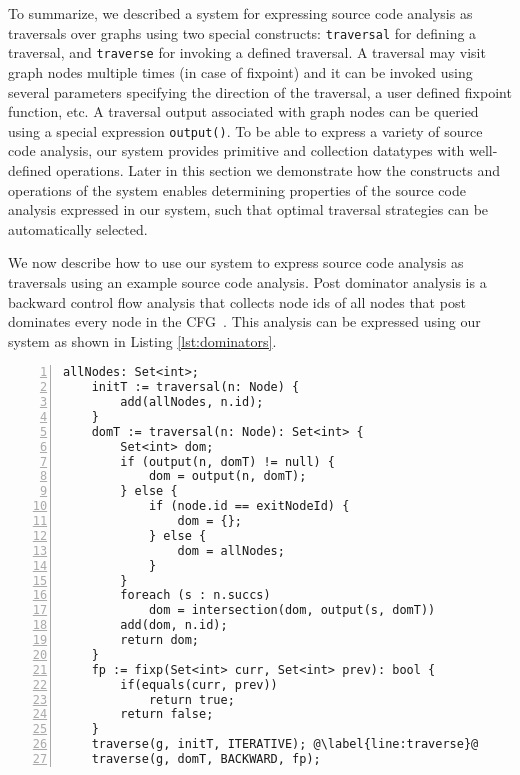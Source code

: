 To summarize, we described a system for expressing source code analysis as
traversals over graphs using two special constructs: \lstinline|traversal| for
defining a traversal, and \lstinline|traverse| for invoking a defined traversal. 
A traversal may visit graph nodes multiple times (in case of fixpoint) and it
can be invoked using several parameters specifying the direction of the
traversal, a user defined fixpoint function, etc.
A traversal output associated with graph nodes can be queried using a special
expression \lstinline|output()|. 
To be able to express a variety of source code analysis, our system provides
primitive and collection datatypes with well-defined operations.
Later in this section we demonstrate how the constructs and operations of the
system enables determining properties of the source code analysis expressed
in our system, such that optimal traversal strategies can be automatically
selected.

 We now describe how to use our system
to express source code analysis as traversals using an example source code analysis.
Post dominator analysis is a backward control flow analysis that collects node
ids of all nodes that post dominates every node in the CFG~\cite{compilers}.
This analysis can be expressed using our system as shown in Listing
\ref{lst:dominators}.

\begin{lstlisting}[basicstyle=\footnotesize\ttfamily, numbers=left, numbersep=-8pt, 
escapechar=@, caption={Post dominator analysis: an example source code analysis
expressed using our system.}, label={lst:dominators}] 
	allNodes: Set<int>;
	initT := traversal(n: Node) { 
		add(allNodes, n.id);
	}
	domT := traversal(n: Node): Set<int> { 
		Set<int> dom;
		if (output(n, domT) != null) {
			dom = output(n, domT);
		} else {
			if (node.id == exitNodeId) {
				dom = {};
			} else {
				dom = allNodes;
			}
		}
		foreach (s : n.succs) 
			dom = intersection(dom, output(s, domT)) 
		add(dom, n.id); 
		return dom; 
	} 
	fp := fixp(Set<int> curr, Set<int> prev): bool {
		if(equals(curr, prev))
			return true;
		return false;
	}
	traverse(g, initT, ITERATIVE); @\label{line:traverse}@
	traverse(g, domT, BACKWARD, fp); 				
\end{lstlisting}

